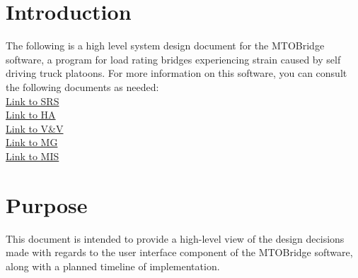 \documentclass[12pt, titlepage]{article}
\begin{document}
\section{Introduction}
The following is a high level system design document for the MTOBridge software, a program for load rating bridges experiencing strain caused by self driving truck platoons. For more information on this software, you can consult the following documents as needed:\\
\href{../../SRS/SRS.pdf}{Link to SRS}\\
\href{../../HazardAnalysis/HazardAnalysis.pdf}{Link to HA}\\
\href{../../VnVPlan/VnVPlan.pdf}{Link to V\&V}\\
\href{../../Design/SoftArchitecture/MG.pdf}{Link to MG}\\
\href{../../Design/SystDesign/SystDes.pdf}{Link to MIS}\\
\section{Purpose}
This document is intended to provide a high-level view of the design decisions made with regards to the user interface component of the MTOBridge software, along with a planned timeline of implementation.
\end{document}

